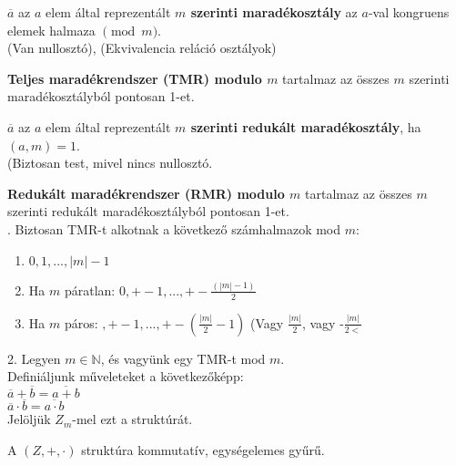 \begin{frame}
  \begin{tcolorbox}[title={Def.: TMR, RMR}]
    $\overline{a}$ az $a$ elem által reprezentált \textbf{$m$ szerinti maradékosztály} az $a$-val kongruens elemek halmaza $\pmod{m}$.\\
    {\footnotesize (Van nullosztó), (Ekvivalencia reláció osztályok)}
    \mmedskip

    \textbf{Teljes maradékrendszer (TMR) modulo $m$} tartalmaz az összes $m$ szerinti maradékosztályból pontosan 1-et.\\
    \mmedskip

    $\overline{a}$ az $a$ elem által reprezentált \textbf{$m$ szerinti redukált maradékosztály}, ha $(a, m) = 1$.\\
    {\footnotesize (Biztosan test, mivel nincs nullosztó.}\\
    \mmedskip

    \textbf{Redukált maradékrendszer (RMR) modulo $m$} tartalmaz az összes $m$ szerinti redukált maradékosztályból pontosan 1-et.\\
  . Biztosan TMR-t alkotnak a következő számhalmazok mod $m$:\\
    \begin{enumerate}
      \item $0, 1, ..., |m| - 1$
      \item Ha $m$ páratlan: $0, +-1, ..., +-\frac{(|m| - 1)}{2}$
      \item Ha $m$ páros: $ , +-1, ..., +-(\frac{|m|}{2} - 1)$ (Vagy $\frac{|m|}{2}$, vagy -$\frac{|m|}{2<}$
    \end{enumerate}
    \mmedskip

    2. Legyen $m \in \mathbb{N}$, és vagyünk egy TMR-t mod $m$.\\
    Definiáljunk műveleteket a következőképp:\\
    $\overline{a} + \overline{b} = \overline{a + b}$\\
    $\overline{a} \cdot \overline{b} = \overline{a \cdot b}$\\
    Jelöljük $Z_m$-mel ezt a struktúrát.\\
    \mmedskip

    A $(Z, +, {\cdot})$ struktúra kommutatív, egységelemes gyűrű.
  \end{tcolorbox}
\end{frame}

